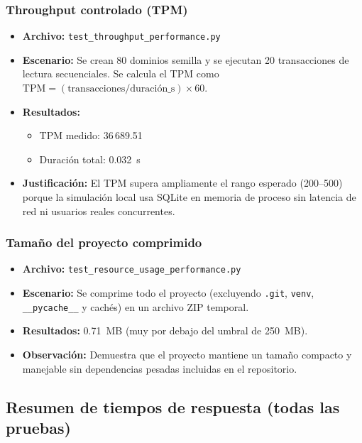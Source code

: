 \documentclass[12pt,a4paper]{article}
\begin{document}
\subsubsection{Throughput controlado (TPM)}

\begin{itemize}
  \item \textbf{Archivo:} \texttt{test\_throughput\_performance.py}
  \item \textbf{Escenario:} Se crean 80 dominios semilla y se ejecutan 20 transacciones de
        lectura secuenciales. Se calcula el TPM como
        $\text{TPM} = (\text{transacciones} / \text{duración\_s}) \times 60$.
  \item \textbf{Resultados:}
        \begin{itemize}
          \item TPM medido: 36\,689.51
          \item Duración total: 0.032~s
        \end{itemize}
  \item \textbf{Justificación:} El TPM supera ampliamente el rango esperado (200--500) porque
        la simulación local usa SQLite en memoria de proceso sin latencia de red ni usuarios
        reales concurrentes.
\end{itemize}

\subsubsection{Tamaño del proyecto comprimido}

\begin{itemize}
  \item \textbf{Archivo:} \texttt{test\_resource\_usage\_performance.py}
  \item \textbf{Escenario:} Se comprime todo el proyecto (excluyendo \texttt{.git},
        \texttt{venv}, \texttt{\_\_pycache\_\_} y cachés) en un archivo ZIP temporal.
  \item \textbf{Resultados:} 0.71~MB (muy por debajo del umbral de 250~MB).
  \item \textbf{Observación:} Demuestra que el proyecto mantiene un tamaño compacto y
        manejable sin dependencias pesadas incluidas en el repositorio.
\end{itemize}

\subsection{Resumen de tiempos de respuesta (todas las pruebas)}
\end{document}
